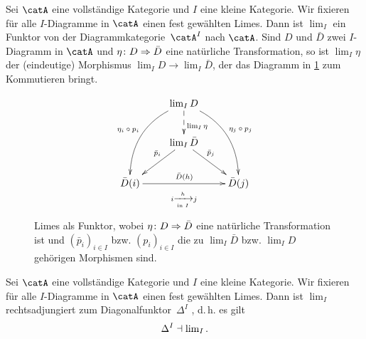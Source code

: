 \begin{thErinnerung}
    Sei $\catA$ eine vollständige Kategorie und $I$ eine kleine Kategorie.
    Wir fixieren für alle $I$-Diagramme in $\catA$ einen fest gewählten Limes.
    Dann ist $\lim_I$ ein Funktor von der Diagrammkategorie~$\catA^I$ nach
    $\catA$. Sind $D$ und $\bar D$ zwei $I$-Diagramm in $\catA$ und
    $\eta\colon D\mathrel{\Rightarrow} \bar D$ eine natürliche Transformation,
    so ist $\lim_I\eta$ der (eindeutige) Morphismus $\lim_I D\to\lim_I\bar D$,
    der das Diagramm in \cref{ch3:fig:limesalsfunktor} zum Kommutieren bringt.
    \begin{figure}
        \centering
        \begin{equation*}
                \xymatrix{
                    &        \ar@/_1.5pc/[ddl]_{\eta_i\after p_i} 
                    \lim_I D \ar@/^1.5pc/[ddr]^{\eta_j\after p_j} 
                    \ar@{-->}[d]^(.57){\lim_I\eta} &
                    \\
                    & \ar[dl]_(.4){\bar p_i} \lim_I\bar D 
                      \ar[dr]^(.4){\bar p_j} &
                    \\
                    \bar D(i) \ar[rr]^{\bar D(h)}
                    \ar@{}@<-16pt>[rr]|-{i \xrightarrow[\text{in $I$}]{h} j}
                    & & \bar D(j)
                }
        \end{equation*}
        \caption{Limes als Funktor, wobei $\eta\colon D\mathrel{\Rightarrow}\bar D$ eine
            natürliche Transformation ist und $(\bar p_i)_{i\in I}$ bzw.
            $(p_i)_{i\in I}$ die zu $\lim_I\bar D$ bzw. $\lim_I D$ gehörigen
            Morphismen sind.}
        \label{ch3:fig:limesalsfunktor}
    \end{figure}
\end{thErinnerung}

\begin{thBeispiel}
    \label{ch3:bsp:limesrechtsadjungiert}
    Sei $\catA$ eine vollständige Kategorie und $I$ eine kleine Kategorie.
    Wir fixieren für alle $I$-Diagramme in $\catA$ einen fest gewählten Limes.
    Dann ist $\lim_I$ rechtsadjungiert zum Diagonalfunktor~$\Delta^I$
    , d.\,h. es gilt
    \[ \Delta^I \leftadjoint \lim\nolimits_I  . \]
\end{thBeispiel}

